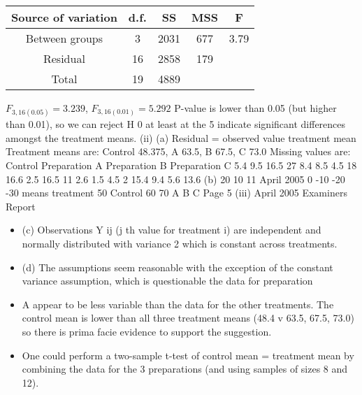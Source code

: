 \documentclass[a4paper,12pt]{article}
\begin{document}
\begin{center}
\begin{tabular}{|c|c|c|c|c|} \hline 
Source of variation	&	d.f.	&	SS	&	MSS	&	F	\\ \hline
Between groups	&	3	&	2031	&	677	&	3.79	\\ \hline
Residual	&	16	&	2858	&	179	&		\\ \hline
Total	&	19	&	4889	&		&		\\ \hline
\end{tabular}
\end{center}
$F_{3,16 (0.05)} = 3.239$, $F_{3,16 (0.01)} = 5.292$
P-value is lower than 0.05 (but higher than 0.01), so we can reject H 0 at least
at the 5%
indicate significant differences amongst the treatment means.
(ii)
(a)
Residual = observed value treatment mean
Treatment means are: Control 48.375, A 63.5, B 67.5, C 73.0
Missing values are:
Control
Preparation A
Preparation B
Preparation C
5.4
9.5
16.5
27
8.4
8.5
4.5
18
16.6
2.5
16.5
11
2.6
1.5
4.5
2
15.4
9.4
5.6
13.6
(b)
20
10
11
April 2005
0
-10
-20
-30
means
treatment
50
Control
60
70
A
B
C
Page 5 
(iii)
April 2005
Examiners Report
\begin{itemize}
\item (c) Observations Y ij (j th value for treatment i) are independent and
normally distributed with variance 2 which is constant across
treatments.
\item (d) The assumptions seem reasonable
with the exception of the constant
variance assumption, which is questionable
the data for preparation
\item A appear to be less variable than the data for the other treatments.
The control mean is lower than all three treatment means
(48.4 v 63.5, 67.5, 73.0) so there is prima facie evidence to support the suggestion.
\item One could perform a two-sample t-test of control mean = treatment mean by combining the data for the 3 preparations (and using samples of sizes 8 and 12).
\end{itemize}
\end{document}
